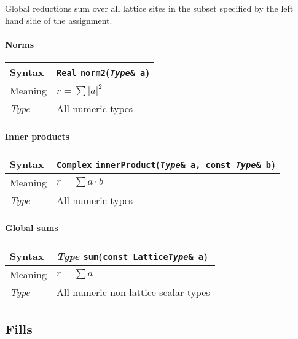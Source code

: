 \documentclass[12pt,letterpaper]{article}
\newcommand{\tReal}{Real}
\newcommand{\tComplex}{Complex}
\newcommand{\allNumericTypes}{All numeric types}
\newcommand{\itt}{\it Type}
\begin{document}
Global reductions sum over all lattice sites in the subset specified by 
the left hand side of the assignment.

\paragraph{Norms}

\begin{flushleft}
  \begin{tabular}{|l|l|}
  \hline
  Syntax      & {\tt \tReal} \verb|norm2|({\tt {\it Type}\& a})\\
  \hline
  Meaning     & $r = \sum |a|^2$ \\
  \hline
  \itt        & \allNumericTypes \\
  \hline
  \end{tabular}
\end{flushleft}

\paragraph{Inner products}

\begin{flushleft}
  \begin{tabular}{|l|l|}
  \hline
  Syntax      & {\tt \tComplex} \verb|innerProduct|({\tt {\it Type}\& a, const {\it Type}\& b})\\
  \hline
  Meaning     & $r = \sum a \cdot b$ \\
  \hline
  \itt        & \allNumericTypes \\
  \hline
  \end{tabular}
\end{flushleft}


\paragraph{Global sums}

\begin{flushleft}
  \begin{tabular}{|l|l|}
  \hline
  Syntax      & {\it Type} \verb|sum|({\tt const Lattice{\it Type}\& a})\\
  \hline
  Meaning     & $r = \sum a$\\
  \hline
  \itt     & All numeric non-lattice scalar types \\
  \hline
  \end{tabular}
\end{flushleft}


\subsection{Fills}
\end{document}
